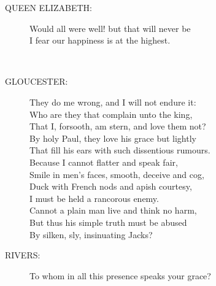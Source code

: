 \documentclass{article}
\begin{document}
\begin{description}
\item[QUEEN ELIZABETH:] 
\hspace{1pt}Would all were well! but that will never be\\
\hspace{1pt}I fear our happiness is at the highest.\\
\end{description}
\\
\begin{description}
\item[GLOUCESTER:] 
\hspace{1pt}They do me wrong, and I will not endure it:\\
\hspace{1pt}Who are they that complain unto the king,\\
\hspace{1pt}That I, forsooth, am stern, and love them not?\\
\hspace{1pt}By holy Paul, they love his grace but lightly\\
\hspace{1pt}That fill his ears with such dissentious rumours.\\
\hspace{1pt}Because I cannot flatter and speak fair,\\
\hspace{1pt}Smile in men's faces, smooth, deceive and cog,\\
\hspace{1pt}Duck with French nods and apish courtesy,\\
\hspace{1pt}I must be held a rancorous enemy.\\
\hspace{1pt}Cannot a plain man live and think no harm,\\
\hspace{1pt}But thus his simple truth must be abused\\
\hspace{1pt}By silken, sly, insinuating Jacks?\\
\end{description}
\begin{description}
\item[RIVERS:] 
\hspace{1pt}To whom in all this presence speaks your grace?\\
\end{description}
\end{document}
